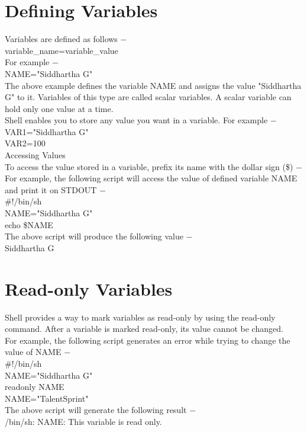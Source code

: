 \documentclass{article}
\begin{document}
\section*{Defining Variables}
Variables are defined as follows −\\
variable\_name=variable\_value\\
For example −\\
NAME="Siddhartha G"\\
The above example defines the variable NAME and assigns the value "Siddhartha G" to it. Variables of this type are called scalar variables. A scalar variable can hold only one value at a time.\\
Shell enables you to store any value you want in a variable. For example −\\
VAR1="Siddhartha G"\\
VAR2=100\\
Accessing Values\\
To access the value stored in a variable, prefix its name with the dollar sign (\$) −\\
For example, the following script will access the value of defined variable NAME and print it on STDOUT −\\
\#!/bin/sh\\
NAME="Siddhartha G"\\
echo \$NAME\\
The above script will produce the following value −\\
Siddhartha G\\

\section*{Read-only Variables}
Shell provides a way to mark variables as read-only by using the read-only command. After a variable is marked read-only, its value cannot be changed.\\
For example, the following script generates an error while trying to change the value of NAME −\\
\#!/bin/sh\\
NAME="Siddhartha G"\\
readonly NAME\\
NAME="TalentSprint"\\
The above script will generate the following result −\\
/bin/sh: NAME: This variable is read only.\\
\end{document}
